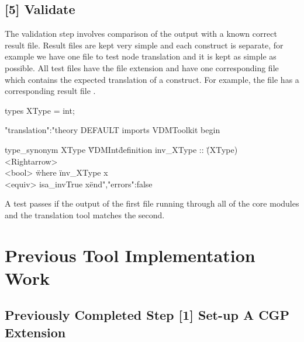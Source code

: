 	\subsection{	[5] Validate} \label{vdt}
	The validation step involves comparison of the output with a known correct result file. Result files are kept very simple and each construct is separate, for example we have one file to test  node translation and it is kept as simple as possible. All test files have the  file extension and have one corresponding  file which contains the expected translation of a construct. For example, the file  has a corresponding result file . 
	\begin{vdmsl}[label=lst:Int.vdmsl,caption=Int.vdmsl]
	types
	XType = int;
	\end{vdmsl}
	\begin{vdmsl}[label=lst:Int.vdmsl.result, caption=Int.vdmsl.result]
	{"translation":"theory DEFAULT
	imports VDMToolkit
	begin

	type_synonym XType \= \"VDMInt\"




	definition
	    inv_XType :: \"(XType) \\<Rightarrow> \\<bool> \"
	    where
	    \"inv_XType x \\<equiv> isa_invTrue x\"

	end","errors":false}
	\end{vdmsl}  
	A test passes if the output of the first file running through all of the core modules and the translation tool matches the second.

	\section{Previous Tool Implementation Work}
	\subsection{Previously Completed Step [1] Set-up A CGP Extension}

